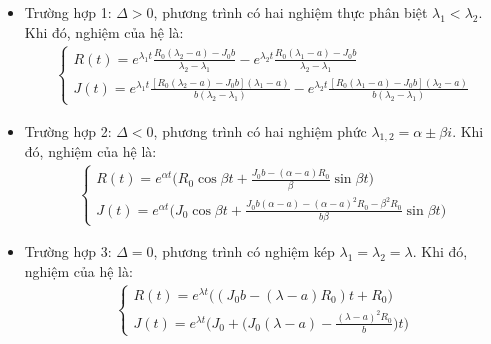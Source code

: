 \begin{itemize}
    \item Trường hợp 1: $\Delta>0$, phương trình có hai nghiệm thực phân biệt $\lambda_1<\lambda_2$. Khi đó, nghiệm của hệ là:
    \begin{align*}
        \begin{cases}
             R(t)=e^{\lambda_1t}\frac{R_0(\lambda_2-a)-J_0b}{\lambda_2-\lambda_1}-e^{\lambda_2t}\frac{R_0(\lambda_1-a)-J_0b}{\lambda_2-\lambda_1}\\
              J(t)=e^{\lambda_1t}\frac{[R_0(\lambda_2-a)-J_0b](\lambda_1-a)}{b(\lambda_2-\lambda_1)}-e^{\lambda_2t}\frac{[R_0(\lambda_1-a)-J_0b] (\lambda_2-a)}{b(\lambda_2-\lambda_1)}
        \end{cases}
    \end{align*}
    \item Trường hợp 2: $\Delta<0$, phương trình có hai nghiệm phức $\lambda_{1,2}=\alpha \pm \beta i$. Khi đó, nghiệm của hệ là:
    \begin{align*}
        \begin{cases}
            R(t)=e^{\alpha t}\bigg( R_0\cos {\beta t} + \frac{J_0b-(\alpha-a)R_0}{\beta}\sin{\beta t}\bigg)\\
            J(t)=e^{\alpha t}\bigg( J_0\cos {\beta t} + \frac{J_0b(\alpha-a)-(\alpha-a)^2 R_0-\beta^2R_0}{b\beta}\sin{\beta t}\bigg)
        \end{cases}
    \end{align*}
    \item Trường hợp 3: $\Delta=0$, phương trình có nghiệm kép $\lambda_1=\lambda_2=\lambda$. Khi đó, nghiệm của hệ là:
    \begin{align*}
        \begin{cases}
            R(t)=e^{\lambda t}\big((J_0b-(\lambda-a)R_0)t+R_0\big)\\
            J(t)=e^{\lambda t}\bigg(J_0+\big(J_0(\lambda-a)-\frac{(\lambda-a)^2R_0}{b}\big)t\bigg)
        \end{cases}
    \end{align*}
\end{itemize}
